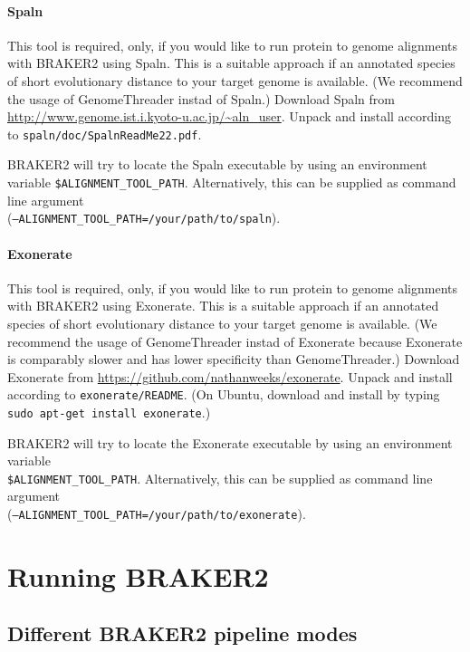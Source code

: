\documentclass[]{article}
\let\oldparagraph\paragraph
\renewcommand{\paragraph}[1]{\oldparagraph{#1}\mbox{}}
\begin{document}
\paragraph{Spaln}\label{spaln}

This tool is required, only, if you would like to run protein to genome
alignments with BRAKER2 using Spaln. This is a suitable approach if an
annotated species of short evolutionary distance to your target genome
is available. (We recommend the usage of GenomeThreader instad of
Spaln.) Download Spaln from
\url{http://www.genome.ist.i.kyoto-u.ac.jp/~aln_user}. Unpack and
install according to \texttt{spaln/doc/SpalnReadMe22.pdf}.

BRAKER2 will try to locate the Spaln executable by using an environment
variable \texttt{\$ALIGNMENT\_TOOL\_PATH}. Alternatively, this can be
supplied as command line argument\\
(\texttt{–ALIGNMENT\_TOOL\_PATH=/your/path/to/spaln}).

\paragraph{Exonerate}\label{exonerate}

This tool is required, only, if you would like to run protein to genome
alignments with BRAKER2 using Exonerate. This is a suitable approach if
an annotated species of short evolutionary distance to your target
genome is available. (We recommend the usage of GenomeThreader instad of
Exonerate because Exonerate is comparably slower and has lower
specificity than GenomeThreader.) Download Exonerate from
\url{https://github.com/nathanweeks/exonerate}. Unpack and install
according to \texttt{exonerate/README}. (On Ubuntu, download and install
by typing \texttt{sudo\ apt-get\ install\ exonerate}.)

BRAKER2 will try to locate the Exonerate executable by using an
environment variable\\
\texttt{\$ALIGNMENT\_TOOL\_PATH}. Alternatively, this can be supplied as
command line argument\\
(\texttt{–ALIGNMENT\_TOOL\_PATH=/your/path/to/exonerate}).

\hypertarget{running-braker2}{\section{Running
BRAKER2}\label{running-braker2}}

\hypertarget{different-braker2-pipeline-modes}{\subsection{Different
BRAKER2 pipeline modes}\label{different-braker2-pipeline-modes}}
\end{document}
